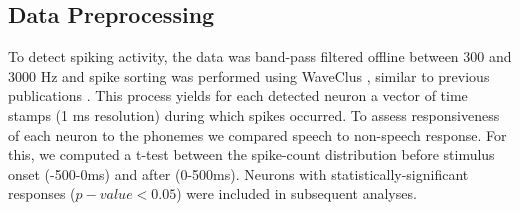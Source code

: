\subsection{Data Preprocessing}
To detect spiking activity, the data was band-pass filtered offline between 300 and 3000 Hz and spike sorting was performed using WaveClus \citep{quiroga2004unsupervised}, similar to previous publications \citep{quiroga2005invariant}. This process yields for each detected neuron a vector of time stamps (1 ms resolution) during which spikes occurred. To assess responsiveness of each neuron to the phonemes we compared speech to non-speech response. For this, we computed a t-test between the spike-count distribution before stimulus onset (-500-0ms) and after (0-500ms). Neurons with statistically-significant responses ($p-value<0.05$) were included in subsequent analyses. 

